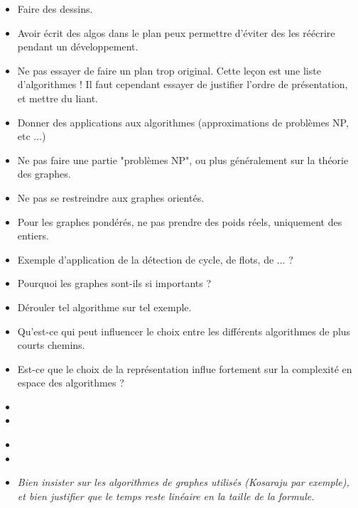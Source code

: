 \documentclass{agregfiche}
\begin{document}
\secpieges

\begin{itemize}
    \item Faire des dessins.
    \item Avoir écrit des algos dans le plan peux permettre d'éviter des les réécrire pendant un développement.
    \item Ne pas essayer de faire un plan trop original. Cette leçon est une liste d'algorithmes ! Il faut cependant essayer de justifier l'ordre de présentation, et mettre du liant.
    \item Donner des applications aux algorithmes (approximations de problèmes NP, etc ...)
    \item Ne pas faire une partie "problèmes NP", ou plus généralement sur la théorie des graphes.
    \item Ne pas se restreindre aux graphes orientés.
    \item Pour les graphes pondérés, ne pas prendre des poids réels, uniquement des entiers.
\end{itemize}

\secquestionsclassiques

\begin{itemize}
    \item Exemple d'application de la détection de cycle, de flots, de ... ?
    \item Pourquoi les graphes sont-ils si importants ?
    \item Dérouler tel algorithme sur tel exemple.
    \item Qu'est-ce qui peut influencer le choix entre les différents algorithmes de plus courts chemins.
    \item Est-ce que le choix de la représentation influe fortement sur la complexité en espace des algorithmes ?
\end{itemize}

\secreferences

\begin{itemize}
    \item 
    \item 
\end{itemize}

\secdev

\begin{itemize}
	\item 
	\item 
        \item 
          \textit{Bien insister sur les algorithmes de graphes utilisés (Kosaraju par exemple), et bien justifier que le temps reste linéaire en la taille de la formule.}
\end{itemize}
\end{document}
